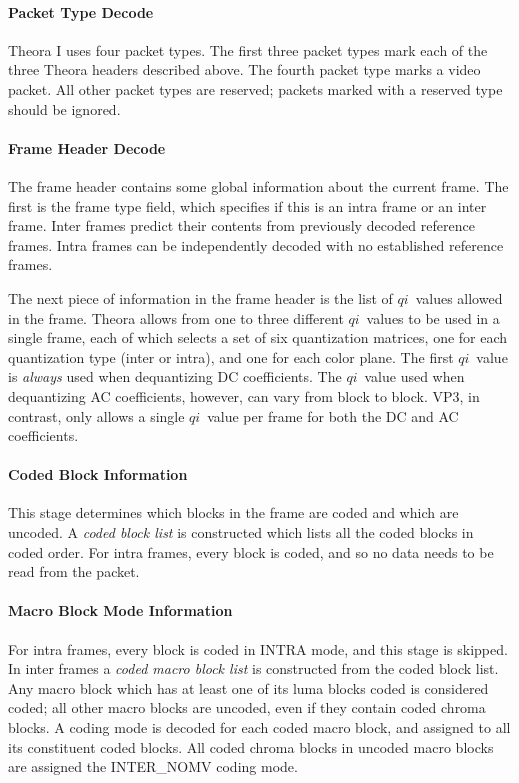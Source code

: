 \documentclass[11pt,letterpaper]{book}
\newcommand{\idx}[1]{{\ensuremath{\mathit{#1}}}}
\newcommand{\qi}{\idx{qi}}
\newcommand{\term}[1]{{\em #1}}
\numberwithin{equation}{chapter}
\numberwithin{figure}{chapter}
\numberwithin{table}{chapter}
\begin{document}
\paragraph{Packet Type Decode}

Theora I uses four packet types.
The first three packet types mark each of the three Theora headers described
 above.
The fourth packet type marks a video packet.
All other packet types are reserved; packets marked with a reserved type should
 be ignored.

\paragraph{Frame Header Decode}

The frame header contains some global information about the current frame.
The first is the frame type field, which specifies if this is an intra frame or
 an inter frame.
Inter frames predict their contents from previously decoded reference frames.
Intra frames can be independently decoded with no established reference frames.

The next piece of information in the frame header is the list of \qi\ values
 allowed in the frame.
Theora allows from one to three different \qi\ values to be used in a single
 frame, each of which selects a set of six quantization matrices, one for each
 quantization type (inter or intra), and one for each color plane.
The first \qi\ value is {\em always} used when dequantizing DC coefficients.
The \qi\ value used when dequantizing AC coefficients, however, can vary from
 block to block.
VP3, in contrast, only allows a single \qi\ value per frame for both the DC and
 AC coefficients.

\paragraph{Coded Block Information}

This stage determines which blocks in the frame are coded and which are
 uncoded.
A \term{coded block list} is constructed which lists all the coded blocks in
 coded order.
For intra frames, every block is coded, and so no data needs to be read from
 the packet.

\paragraph{Macro Block Mode Information}

For intra frames, every block is coded in INTRA mode, and this stage is
 skipped.
In inter frames a \term{coded macro block list} is constructed from the coded
 block list.
Any macro block which has at least one of its luma blocks coded is considered
 coded; all other macro blocks are uncoded, even if they contain coded chroma
 blocks.
A coding mode is decoded for each coded macro block, and assigned to all its
 constituent coded blocks.
All coded chroma blocks in uncoded macro blocks are assigned the INTER\_NOMV
 coding mode.
\end{document}
